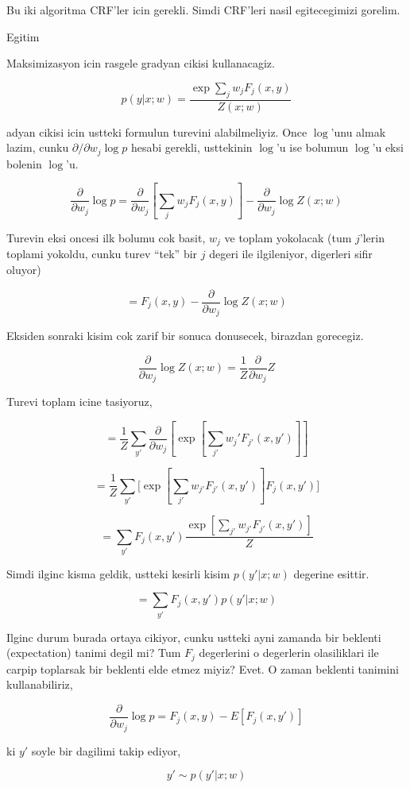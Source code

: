 \documentclass[12pt,fleqn]{article}\usepackage{../common}
\begin{document}
Bu iki algoritma CRF'ler icin gerekli. Simdi CRF'leri nasil egitecegimizi
gorelim. 

Egitim

Maksimizasyon icin rasgele gradyan cikisi kullanacagiz. 

$$ 
p(y|x;w) = \frac{\exp \sum_j w_j F_j(x,y)  }{Z(x;w)}
$$

adyan cikisi icin ustteki formulun turevini alabilmeliyiz. Once
$\log$'unu almak lazim, cunku $\partial / \partial w_j \log p$ hesabi gerekli, usttekinin $\log$'u 
ise bolumun $\log$'u eksi bolenin $\log$'u. 

$$
 \frac{\partial}{\partial w_j} \log p
=
\frac{\partial}{\partial w_j} [ \sum_j w_j F_j(x,y)] -
\frac{\partial}{\partial w_j} \log Z(x;w)
 $$

Turevin eksi oncesi ilk bolumu cok basit, $w_j$ ve toplam yokolacak (tum
$j$'lerin toplami yokoldu, cunku turev ``tek'' bir $j$ degeri ile
ilgileniyor, digerleri sifir oluyor)


$$ 
=
 F_j(x,y) -
\frac{\partial}{\partial w_j} \log Z(x;w)
$$

Eksiden sonraki kisim cok zarif bir sonuca donusecek, birazdan gorecegiz. 

$$ 
\frac{\partial}{\partial w_j} \log Z(x;w) = 
\frac{ 1}{Z} \frac{\partial}{\partial w_j} Z 
$$

Turevi toplam icine tasiyoruz, 

$$ 
= \frac{1}{Z} \sum_{y'} \frac{\partial}{\partial w_j} [
\exp [ \sum_{j'} w_j' F_{j'}(x,y') ] ] 
$$


$$  
=
\frac{ 1}{Z}\sum_{y'} 
\bigg[
\exp [ \sum_{j'} w_{j'} F_{j'}(x,y') ] F_j(x,y')
\bigg]
$$

$$ 
= \sum_{y'} F_j (x,y')
\frac{
\exp [ \sum_{j'} w_{j'} F_{j'}(x,y') ]
}
{Z}
$$ 


Simdi ilginc kisma geldik, ustteki kesirli kisim $p(y' | x;w)$ degerine
esittir. 

$$ = \sum_{y'} F_j (x,y') p(y' | x;w)$$ 

Ilginc durum burada ortaya cikiyor, cunku ustteki ayni zamanda bir beklenti
(expectation) tanimi degil mi? Tum $F_j$ degerlerini o degerlerin
olasiliklari ile carpip toplarsak bir beklenti elde etmez miyiz? Evet. O
zaman beklenti tanimini kullanabiliriz,

$$\frac{\partial}{\partial w_j} \log p = F_j(x,y) - E[F_j(x,y') ] $$

ki $y'$ soyle bir dagilimi takip ediyor, 

$$ y' \sim p(y'|x;w) $$
\end{document}

